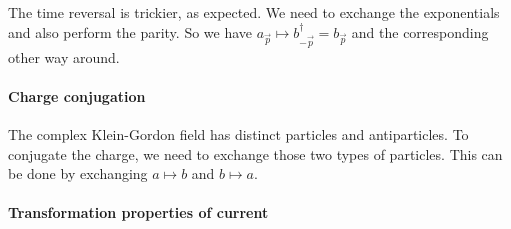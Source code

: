\documentclass[11pt, english, fleqn, DIV=15, headinclude, BCOR=1cm]{scrartcl}
\begin{document}
The time reversal is trickier, as expected. We need to exchange the
exponentials and also perform the parity. So we have $a_{\vec p} \mapsto
b^\dagger_{- \vec p} = b_{\vec p}$ and the corresponding other way around.

\paragraph{Charge conjugation}

The complex Klein-Gordon field has distinct particles and antiparticles. To
conjugate the charge, we need to exchange those two types of particles. This
can be done by exchanging $a \mapsto b$ and $b \mapsto a$.

\paragraph{Transformation properties of current}
\end{document}
